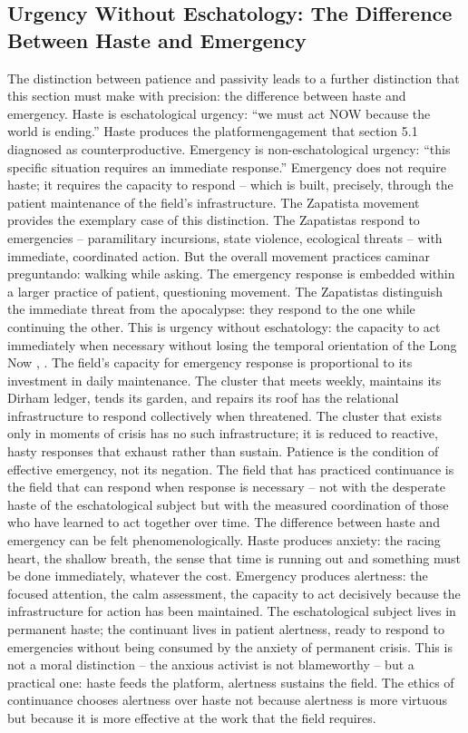 \subsection{Urgency Without Eschatology: The Difference Between Haste and Emergency}

The distinction between patience and passivity leads to a further distinction that this section must make with precision: the difference between haste and emergency. Haste is eschatological urgency: “we must act NOW because the world is ending.” Haste produces the platformengagement that section 5.1 diagnosed as counterproductive. Emergency is non-eschatological urgency: “this specific situation requires an immediate response.” Emergency does not require haste; it requires the capacity to respond – which is built, precisely, through the patient maintenance of the field’s infrastructure. The Zapatista movement provides the exemplary case of this distinction. The Zapatistas respond to emergencies – paramilitary incursions, state violence, ecological threats – with immediate, coordinated action. But the overall movement practices caminar preguntando: walking while asking. The emergency response is embedded within a larger practice of patient, questioning movement. The Zapatistas distinguish the immediate threat from the apocalypse: they respond to the one while continuing the other. This is urgency without eschatology: the capacity to act immediately when necessary without losing the temporal orientation of the Long Now \cite{marcos_1995}, \cite{esteva_2014}. The field’s capacity for emergency response is proportional to its investment in daily maintenance. The cluster that meets weekly, maintains its Dirham ledger, tends its garden, and repairs its roof has the relational infrastructure to respond collectively when threatened. The cluster that exists only in moments of crisis has no such infrastructure; it is reduced to reactive, hasty responses that exhaust rather than sustain. Patience is the condition of effective emergency, not its negation. The field that has practiced continuance is the field that can respond when response is necessary – not with the desperate haste of the eschatological subject but with the measured coordination of those who have learned to act together over time. The difference between haste and emergency can be felt phenomenologically. Haste produces anxiety: the racing heart, the shallow breath, the sense that time is running out and something must be done immediately, whatever the cost. Emergency produces alertness: the focused attention, the calm assessment, the capacity to act decisively because the infrastructure for action has been maintained. The eschatological subject lives in permanent haste; the continuant lives in patient alertness, ready to respond to emergencies without being consumed by the anxiety of permanent crisis. This is not a moral distinction – the anxious activist is not blameworthy – but a practical one: haste feeds the platform, alertness sustains the field. The ethics of continuance chooses alertness over haste not because alertness is more virtuous but because it is more effective at the work that the field requires.

